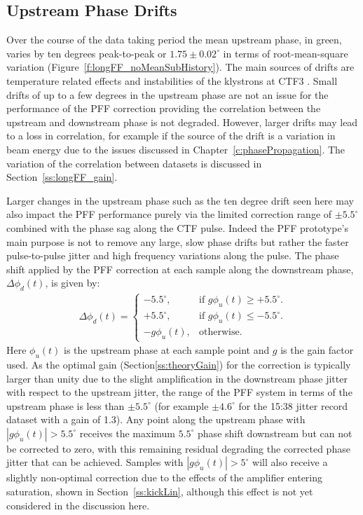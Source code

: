 \subsection{Upstream Phase Drifts}
\label{ss:longFF_upDrifts}

Over the course of the data taking period the mean upstream phase, in green, varies by ten degrees peak-to-peak or \(1.75 \pm 0.02^\circ\) in terms of root-mean-square variation (Figure~\ref{f:longFF_noMeanSubHistory}). The main sources of drifts are temperature related effects and instabilities of the klystrons at CTF3 \cite{lukasIPAC16}. Small drifts of up to a few degrees in the upstream phase are not an issue for the performance of the PFF correction providing the correlation between the upstream and downstream phase is not degraded. However, larger drifts may lead to a loss in correlation, for example if the source of the drift is a variation in beam energy due to the issues discussed in Chapter~\ref{c:phasePropagation}. The variation of the correlation between datasets is discussed in Section~\ref{ss:longFF_gain}.

Larger changes in the upstream phase such as the ten degree drift seen here may also impact the PFF performance purely via the limited correction range of \(\pm5.5^\circ\) combined with the phase sag along the CTF pulse. Indeed the PFF prototype's main purpose is not to remove any large, slow phase drifts but rather the faster pulse-to-pulse jitter and high frequency variations along the pulse. The phase shift applied by the PFF correction at each sample along the downstream phase, \(\Delta\phi_d(t)\), is given by:
\begin{eqnarray}
	\Delta\phi_d(t) = \begin{cases}
	-5.5^\circ, &  \text{if $g\phi_u(t) \geq+5.5^\circ$.}\\
	+5.5^\circ, &  \text{if $g\phi_u(t)\leq-5.5^\circ$}.\\
	-g\phi_u(t), &  \text{otherwise.}
	\end{cases}
	\label{e:limCorrection}
\end{eqnarray}
Here \(\phi_u(t)\) is the upstream phase at each sample point and \(g\) is the gain factor used. As the optimal gain (Section\ref{ss:theoryGain}) for the correction is typically larger than unity due to the slight amplification in the downstream phase jitter with respect to the upstream jitter, the range of the PFF system in terms of the upstream phase is less than \(\pm5.5^\circ\) (for example \(\pm4.6^\circ\) for the 15:38 jitter record dataset with a gain of 1.3). Any point along the upstream phase with \(|g\phi_u(t)| > 5.5^\circ\) receives the maximum \(5.5^\circ\) phase shift downstream but can not be corrected to zero, with this remaining residual degrading the corrected phase jitter that can be achieved. Samples with  \(|g\phi_u(t)| > 5^\circ\) will also receive a slightly non-optimal correction due to the effects of the amplifier entering saturation, shown in Section~\ref{ss:kickLin}, although this effect is not yet considered in the discussion here.

